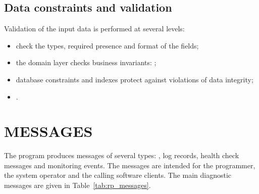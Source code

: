 \documentclass[12pt,a4paper]{extarticle}
\begin{document}
\subsection{Data constraints and validation}

\begin{hseExample}
Validation of the input data is performed at several levels:

\begin{itemize}[leftmargin=1.25cm]
    \item {} check the types, required presence and format of the fields;
    \item the domain layer checks business invariants: ;
    \item database constraints and indexes protect against violations of data integrity;
    \item {}.
\end{itemize}
\end{hseExample}

\clearpage

\section{MESSAGES}

\begin{hseExample}
The program produces messages of several types: , log records, health check messages and monitoring events. The messages are intended for the programmer, the system operator and the calling software clients. The main diagnostic messages are given in Table~\ref{tab:rp_messages}.
\end{hseExample}
\end{document}

